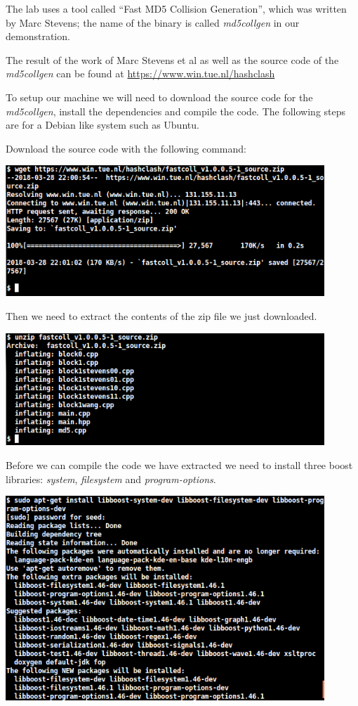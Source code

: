\documentclass[a4paper]{article}
\begin{document}
The lab uses a tool called “Fast MD5 Collision Generation”, which was written by Marc Stevens; the name of the binary is called
\textit{md5collgen} in our demonstration.

The result of the work of Marc Stevens et al as well as the source code of the \textit{md5collgen} can be found at \href{https://www.win.tue.nl/hashclash}{https://www.win.tue.nl/hashclash}

To setup our machine we will need to download the source code for the \textit{md5collgen}, install the dependencies and compile the code. The following steps are for a Debian like system such as Ubuntu.

Download the source code with the following command:

\bigskip

\includegraphics[width=0.9\textwidth]{bash/wget.png}

\bigskip

Then we need to extract the contents of the zip file we just downloaded.

\bigskip

\includegraphics[width=0.9\textwidth]{bash/unzip.png}

\bigskip

Before we can compile the code we have extracted we need to install three boost libraries: \textit{system}, \textit{filesystem} and \textit{program-options}.

\bigskip

\includegraphics[width=0.9\textwidth]{bash/boost.png}
\end{document}
